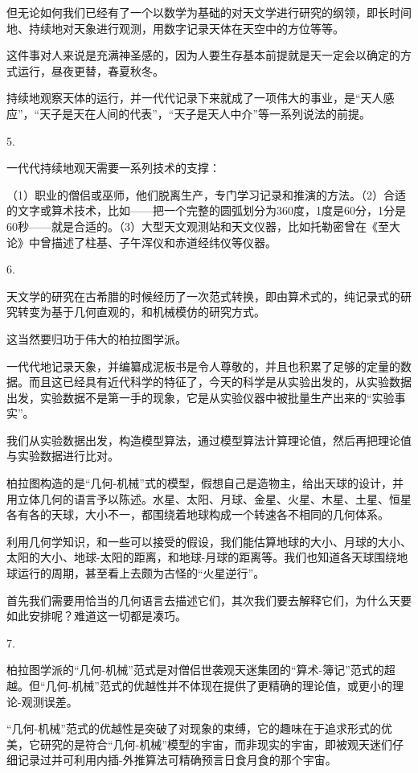 但无论如何我们已经有了一个以数学为基础的对天文学进行研究的纲领，即长时间地、持续地对天象进行观测，用数字记录天体在天空中的方位等等。

这件事对人来说是充满神圣感的，因为人要生存基本前提就是天一定会以确定的方式运行，昼夜更替，春夏秋冬。

持续地观察天体的运行，并一代代记录下来就成了一项伟大的事业，是“天人感应”，“天子是天在人间的代表”，“天子是天人中介”等一系列说法的前提。

5.

一代代持续地观天需要一系列技术的支撑：

（1）职业的僧侣或巫师，他们脱离生产，专门学习记录和推演的方法。（2）合适的文字或算术技术，比如——把一个完整的圆弧划分为360度，1度是60分，1分是60秒——就是合适的。（3）大型天文观测站和天文仪器，比如托勒密曾在《至大论》中曾描述了柱基、子午浑仪和赤道经纬仪等仪器。

6.

天文学的研究在古希腊的时候经历了一次范式转换，即由算术式的，纯记录式的研究转变为基于几何直观的，和机械模仿的研究方式。

这当然要归功于伟大的柏拉图学派。

一代代地记录天象，并编纂成泥板书是令人尊敬的，并且也积累了足够的定量的数据。而且这已经具有近代科学的特征了，今天的科学是从实验出发的，从实验数据出发，实验数据不是第一手的现象，它是从实验仪器中被批量生产出来的“实验事实”。

我们从实验数据出发，构造模型算法，通过模型算法计算理论值，然后再把理论值与实验数据进行比对。

柏拉图构造的是“几何-机械”式的模型，假想自己是造物主，给出天球的设计，并用立体几何的语言予以陈述。水星、太阳、月球、金星、火星、木星、土星、恒星各有各的天球，大小不一，都围绕着地球构成一个转速各不相同的几何体系。

利用几何学知识，和一些可以接受的假设，我们能估算地球的大小、月球的大小、太阳的大小、地球-太阳的距离，和地球-月球的距离等。我们也知道各天球围绕地球运行的周期，甚至看上去颇为古怪的“火星逆行”。

首先我们需要用恰当的几何语言去描述它们，其次我们要去解释它们，为什么天要如此安排呢？难道这一切都是凑巧。

7.

柏拉图学派的“几何-机械”范式是对僧侣世袭观天迷集团的“算术-簿记”范式的超越。但“几何-机械”范式的优越性并不体现在提供了更精确的理论值，或更小的理论-观测误差。

“几何-机械”范式的优越性是突破了对现象的束缚，它的趣味在于追求形式的优美，它研究的是符合“几何-机械”模型的宇宙，而非现实的宇宙，即被观天迷们仔细记录过并可利用内插-外推算法可精确预言日食月食的那个宇宙。

